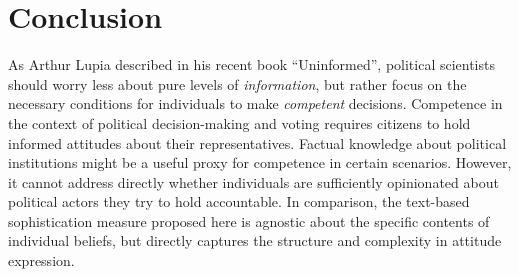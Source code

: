 \documentclass[12pt]{article}
\begin{document}




\section*{Conclusion}

As Arthur Lupia \citeyearpar{lupia2015uninformed} described in his recent book ``Uninformed'', political scientists should worry less about pure levels of \textit{information}, but rather focus on the necessary conditions for individuals to make \textit{competent} decisions. Competence in the context of political decision-making and voting requires citizens to hold informed attitudes about their representatives. Factual knowledge about political institutions might be a useful proxy for competence in certain scenarios. However, it cannot address directly whether individuals are sufficiently opinionated about political actors they try to hold accountable. In comparison, the text-based sophistication measure proposed here is agnostic about the specific contents of individual beliefs, but directly captures the structure and complexity in attitude expression.
\end{document}
